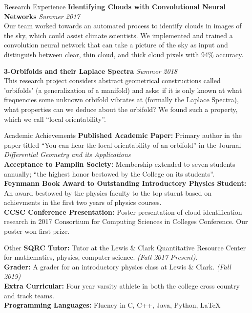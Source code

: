 \documentclass{resume}
\begin{document}
\begin{rSection}{Research Experience}
\textbf{Identifying Clouds with Convolutional Neural Networks} \hfill
\textit{Summer 2017}\\
Our team worked towards an automated process to identify clouds in images
of the sky, which could assist climate scientists. We
implemented and trained a convolution neural network that can take a
picture of the sky as input and distinguish between clear, thin cloud, and
thick cloud pixels with 94\% accuracy.

\textbf{3-Orbifolds and their Laplace Spectra} \hfill \textit{Summer
2018}\\
This research project considers abstract geometrical constructions called
'orbifolds' (a generalization of a manifold) and asks: if it is only known
at what frequencies some unknown orbifold vibrates at (formally the Laplace
Spectra), what properties can we deduce about the orbifold? We found such a
property, which we call ``local orientability''.

\end{rSection}

\begin{rSection}{Academic Achievements} 
    \textbf{Published Academic Paper:} Primary author in the paper titled ``You can hear the local orientability of an orbifold'' in the Journal \textit{Differential Geometry and its Applications}\\
    \textbf{Acceptance to Pamplin Society:} Membership extended to seven
    students annually; ``the highest honor bestowed by the College on its
    students''.\\
    \textbf{Feynmann Book Award to Outstanding Introductory Physics Student:}
    An award bestowed by the physics faculty to the top stuent based on
    achievments in the first two years of physics courses.\\
    \textbf{CCSC Conference Presentation:} Poster presentation of cloud
    identification research in 2017 Consortium for Computing Sciences
    in Colleges Conference. Our poster won first prize.
\end{rSection}
\begin{rSection}{Other}
    \textbf{SQRC Tutor:} Tutor at the Lewis \& Clark Quantitative Resource
    Center for mathematics, physics, computer science. \textit{(Fall 2017-Present)}.\\
    \textbf{Grader:} A grader for an introductory physics class at Lewis \& Clark. \textit{(Fall 2019)}\\
    \textbf{Extra Curricular:} Four year varsity athlete in both the college
    cross country and track teams.\\
    \textbf{Programming Languages:} Fluency in C, C++, Java, Python,
    \LaTeX
\end{rSection}
\end{document}
